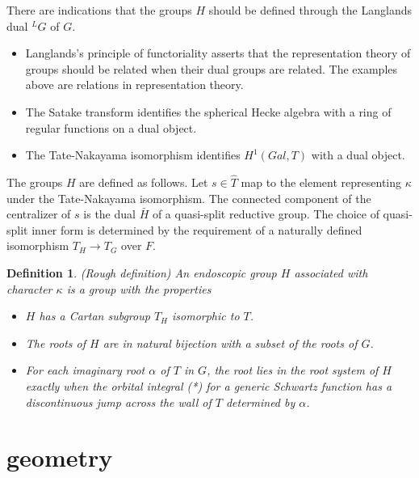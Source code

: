 \documentclass[brochure,english,12pt]{bourbaki}
\newtheorem{definition}[equation]{Definition}
\begin{document}
There are indications that the groups $H$ should be defined through  
the Langlands dual ${}^LG$ of $G$.
\begin{itemize}
\item Langlands's principle of functoriality asserts that the
  representation theory of groups should be related when their dual
  groups are related.  The examples above are relations in
  representation theory.
\item The Satake transform identifies the spherical Hecke algebra with
  a ring of regular functions on a dual object.
\item The Tate-Nakayama isomorphism identifies $H^1(Gal,T)$
with a dual object.
\end{itemize}

The groups $H$ are defined as follows.  Let $s\in \hat T$ map
to the element representing $\kappa$ under the Tate-Nakayama isomorphism.
The connected component of the centralizer of $s$ is the dual $\bar H$
of a quasi-split reductive group.  The choice of
quasi-split inner form is determined by the requirement of a naturally
defined isomorphism $T_H\to T_G$ over $F$.



\begin{definition}
(Rough definition)
An endoscopic group $H$ associated with character $\kappa$ is a group
with the properties
\begin{itemize}
\item $H$ has a Cartan subgroup $T_H$ isomorphic to $T$.
\item The roots of $H$ are in natural bijection with a subset of the roots of $G$.
\item For each imaginary root $\alpha$ of $T$ in $G$, the root
lies in the root system of $H$ exactly when the orbital integral (*)
for a generic Schwartz function has a discontinuous jump across 
the wall of $T$ determined by $\alpha$.
\end{itemize}
\end{definition}


\section{geometry}
\end{document}
